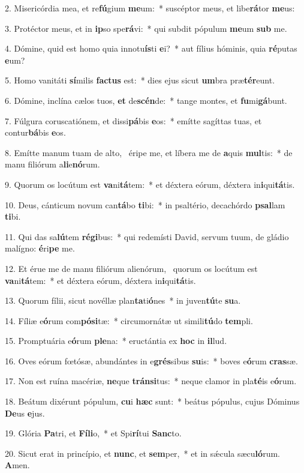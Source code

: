 2. Misericórdia mea, et re\textbf{fú}gium \textbf{me}um:~*  suscéptor meus, et libe\textbf{rá}tor \textbf{me}us:\

3. Protéctor meus, et in \textbf{ip}so spe\textbf{rá}vi:~*  qui subdit pópulum \textbf{me}um \textbf{sub} me.\

4. Dómine, quid est homo quia innotu\textbf{ís}ti \textbf{e}i?~*  aut fílius hóminis, quia \textbf{ré}putas \textbf{e}um?\

5. Homo vanitáti \textbf{sí}milis \textbf{fac}\textbf{tus} est:~*  dies ejus sicut \textbf{um}bra præ\textbf{tér}eunt.\

6. Dómine, inclína cælos tuos, \textbf{et} de\textbf{scén}de:~*  tange montes, et \textbf{fu}mi\textbf{gá}bunt.\

7. Fúlgura coruscatiónem, et dissi\textbf{pá}bis \textbf{e}os:~*  emítte sagíttas tuas, et contur\textbf{bá}bis \textbf{e}os.\

8. Emítte manum tuam de alto, \dag\  éripe me, et líbera me de \textbf{a}quis \textbf{mul}tis:~*  de manu filiórum a\textbf{li}e\textbf{nó}rum.\

9. Quorum os locútum est \textbf{va}ni\textbf{tá}tem:~*  et déxtera eórum, déxtera in\textbf{i}qui\textbf{tá}tis.\

10. Deus, cánticum novum can\textbf{tá}bo \textbf{ti}bi:~*  in psaltério, decachórdo \textbf{psal}lam \textbf{ti}bi.\

11. Qui das sa\textbf{lú}tem \textbf{ré}\textbf{gi}bus:~*  qui redemísti David, servum tuum, de gládio malígno: \textbf{é}ri\textbf{pe} me.\

12. Et érue me de manu filiórum alienórum, \dag\  quorum os locútum est \textbf{va}ni\textbf{tá}tem:~*  et déxtera eórum, déxtera in\textbf{i}qui\textbf{tá}tis.\

13. Quorum fílii, sicut novéllæ plan\textbf{ta}ti\textbf{ó}nes~*  in juven\textbf{tú}te \textbf{su}a.\

14. Fíliæ e\textbf{ó}rum com\textbf{pó}\textbf{si}tæ:~*  circumornátæ ut simili\textbf{tú}do \textbf{tem}pli.\

15. Promptuária e\textbf{ó}rum \textbf{ple}na:~*  eructántia ex \textbf{hoc} in \textbf{il}lud.\

16. Oves eórum fœtósæ, abundántes in e\textbf{grés}sibus \textbf{su}is:~*  boves e\textbf{ó}rum \textbf{cras}sæ.\

17. Non est ruína macériæ, \textbf{ne}que \textbf{tráns}\textbf{i}tus:~*  neque clamor in pla\textbf{té}is e\textbf{ó}rum.\

18. Beátum dixérunt pópulum, \textbf{cu}i \textbf{hæc} sunt:~*  beátus pópulus, cujus Dóminus \textbf{De}us \textbf{e}jus.\

19. Glória \textbf{Pa}tri, et \textbf{Fí}\textbf{li}o,~*  et Spi\textbf{rí}tui \textbf{Sanc}to.\

20. Sicut erat in princípio, et \textbf{nunc}, et \textbf{sem}per,~*  et in sǽcula sæcu\textbf{ló}rum. \textbf{A}men.\

